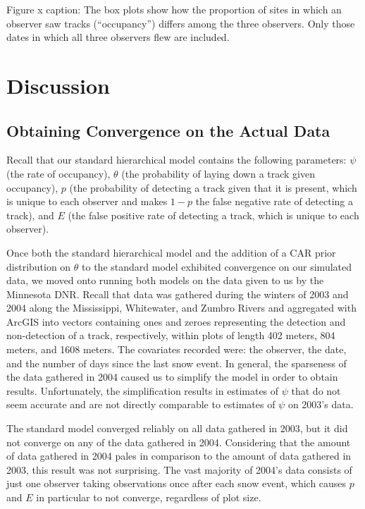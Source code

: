 \documentclass[12pt]{article}
\begin{document}
    Figure x caption:
    The box plots show how the proportion of sites in which an observer saw
    tracks (``occupancy'') differs among the three observers. Only those dates
    in which all three observers flew are included.

\section{Discussion}

    \subsection{Obtaining Convergence on the Actual Data}
    Recall that our standard hierarchical model contains the following
    parameters: \(\psi\) (the rate of occupancy), \(\theta\) (the probability of
    laying down a track given occupancy), \(p\) (the probability of detecting a
    track given that it is present, which is unique to each observer and makes
    \(1-p\) the false negative rate of detecting a track), and \(E\) (the false
    positive rate of detecting a track, which is unique to each observer).

    Once both the standard hierarchical model and the addition of a CAR prior
    distribution on \(\theta\) to the standard model exhibited convergence on
    our simulated data, we moved onto running both models on the data given to
    us by the Minnesota DNR. Recall that data was gathered during the winters of
    2003 and 2004 along the Mississippi, Whitewater, and Zumbro Rivers and
    aggregated with ArcGIS into vectors containing ones and zeroes representing
    the detection and non-detection of a track, respectively, within plots of
    length 402 meters, 804 meters, and 1608 meters. The covariates recorded
    were: the observer, the date, and the number of days since the last snow
    event. In general, the sparseness of the data gathered in 2004 caused us to
    simplify the model in order to obtain results. Unfortunately, the
    simplification results in estimates of \(\psi\) that do not seem accurate
    and are not directly comparable to estimates of \(\psi\) on 2003's data.

    The standard model converged reliably on all data gathered in 2003, but it
    did not converge on any of the data gathered in 2004. Considering that the
    amount of data gathered in 2004 pales in comparison to the amount of data
    gathered in 2003, this result was not surprising. The vast majority of
    2004's data consists of just one observer taking observations once after
    each snow event, which causes \(p\) and \(E\) in particular to not converge,
    regardless of plot size.
\end{document}
